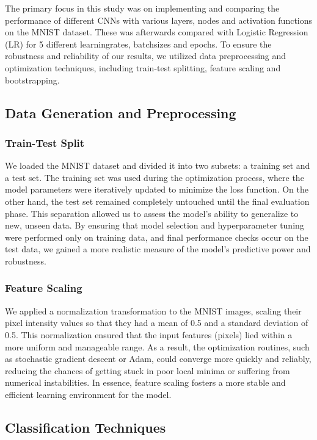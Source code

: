 The primary focus in this study was on implementing and comparing the performance of different CNNs with various layers, nodes and activation functions on the MNIST dataset. These was afterwards compared with Logistic Regression (LR) for 5 different learningrates, batchsizes and epochs. To ensure the robustness and reliability of our results, we utilized data preprocessing and optimization techniques, including train-test splitting, feature scaling and bootstrapping. 

\subsection{Data Generation and Preprocessing}

\subsubsection{Train-Test Split}

 We loaded the MNIST dataset and divided it into two subsets: a training set and a test set. The training set was used during the optimization process, where the model parameters were iteratively updated to minimize the loss function. On the other hand, the test set remained completely untouched until the final evaluation phase. This separation allowed us to assess the model’s ability to generalize to new, unseen data. By ensuring that model selection and hyperparameter tuning were performed only on training data, and final performance checks occur on the test data, we gained a more realistic measure of the model’s predictive power and robustness.

\subsubsection{Feature Scaling}

We applied a normalization transformation to the MNIST images, scaling their pixel intensity values so that they had a mean of 0.5 and a standard deviation of 0.5. This normalization ensured that the input features (pixels) lied within a more uniform and manageable range. As a result, the optimization routines, such as stochastic gradient descent or Adam, could converge more quickly and reliably, reducing the chances of getting stuck in poor local minima or suffering from numerical instabilities. In essence, feature scaling fosters a more stable and efficient learning environment for the model.

\subsection{Classification Techniques}

